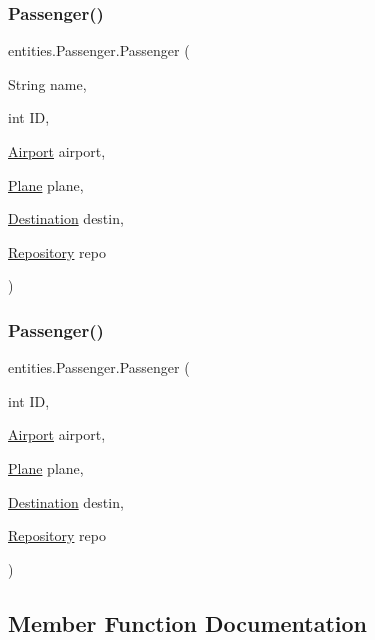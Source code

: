 \subsubsection{\texorpdfstring{Passenger()}{Passenger()}\hspace{0.1cm}{\footnotesize\ttfamily [1/2]}}
{\footnotesize\ttfamily entities.\+Passenger.\+Passenger (\begin{DoxyParamCaption}\item[{String}]{name,  }\item[{int}]{ID,  }\item[{\hyperlink{classshared_regions_1_1_airport}{Airport}}]{airport,  }\item[{\hyperlink{classshared_regions_1_1_plane}{Plane}}]{plane,  }\item[{\hyperlink{classshared_regions_1_1_destination}{Destination}}]{destin,  }\item[{\hyperlink{classshared_regions_1_1_repository}{Repository}}]{repo }\end{DoxyParamCaption})}

\mbox{\label{classentities_1_1_passenger_a90938dda88f21caa028a836449c2647c}} 
\subsubsection{\texorpdfstring{Passenger()}{Passenger()}\hspace{0.1cm}{\footnotesize\ttfamily [2/2]}}
{\footnotesize\ttfamily entities.\+Passenger.\+Passenger (\begin{DoxyParamCaption}\item[{int}]{ID,  }\item[{\hyperlink{classshared_regions_1_1_airport}{Airport}}]{airport,  }\item[{\hyperlink{classshared_regions_1_1_plane}{Plane}}]{plane,  }\item[{\hyperlink{classshared_regions_1_1_destination}{Destination}}]{destin,  }\item[{\hyperlink{classshared_regions_1_1_repository}{Repository}}]{repo }\end{DoxyParamCaption})}



\subsection{Member Function Documentation}
\mbox{\label{classentities_1_1_passenger_a02039d310b9abd8d76438f86c4dd071f}} 
